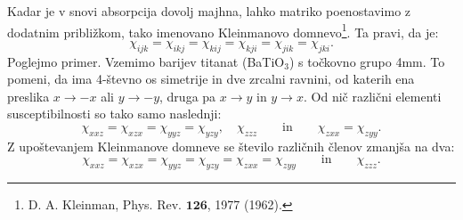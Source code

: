Kadar je v snovi absorpcija dovolj majhna, lahko matriko poenostavimo
z dodatnim približkom, tako imenovano  
 Kleinmanovo domnevo\footnote{D. A. Kleinman, Phys. Rev. $\mathbf{126}$, 1977 (1962).}.
Ta pravi, da je:
\begin{equation}
\chi_{ijk} = \chi_{ikj} = \chi_{kij} = \chi_{kji} = \chi_{jik} = \chi_{jki}.
\label{Klein}
\end{equation}
Poglejmo primer. 
Vzemimo barijev titanat (BaTiO$_3$) s točkovno grupo 4mm. To pomeni, da
ima 4-števno os simetrije in dve zrcalni ravnini, od katerih ena preslika $x \to -x$ ali $y \to -y$, 
druga pa $x\to y$ in $y\to x$. Od nič različni elementi susceptibilnosti so tako samo
naslednji:
\begin{equation}
\chi_{xxz} = \chi_{xzx} =   \chi_{yyz} = \chi_{yzy}, \quad  \chi_{zzz} \qquad \mathrm{in} 
\qquad \chi_{zxx} = \chi_{zyy}.   
\end{equation}
Z upoštevanjem Kleinmanove domneve se število različnih členov zmanjša na dva:
\begin{equation}
\chi_{xxz} = \chi_{xzx} = \chi_{yyz} = \chi_{yzy} =\chi_{zxx} = \chi_{zyy} \qquad \mathrm{in} \qquad \chi_{zzz}.   
\end{equation}
